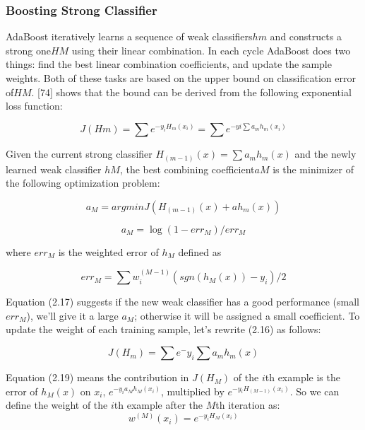 \documentclass[12pt, twoside]{report}
\begin{document}
	\subsubsection{Boosting Strong Classifier}
	
	\par
	AdaBoost iteratively learns a sequence of weak classifiers$ hm$ and constructs a strong one$
	HM$ using their linear combination. In each cycle AdaBoost does two things: find the best
	linear combination coefficients, and update the sample weights. Both of these tasks are
	based on the upper bound on classification error of$ HM$. [74] shows that the bound can be
	derived from the following exponential loss function:
	
	\begin{equation}
	J(Hm)=\sum  e^{-y_iH_m(x_i)} =\sum e^{-yi \sum a_m h_m(x_i)} 
	\end{equation}
	
	Given the current strong classifier $H_(m-1)(x)=\sum a_m h_m (x)$ and the newly learned
	weak classifier $hM$, the best combining coefficient$ aM$ is the minimizer of the following
	optimization problem:
	
	\begin{equation}
	a_M = argminJ(H_(m-1)(x)+ah_m(x))
	\end{equation}
	
	\begin{equation}
	a_M=\log (1-err_M ) /err_M  
	\end{equation}
	
	where $err_M$ is the weighted error of $h_M$ defined as
	
	\begin{equation}
	err_M=\sum w_i^(M-1)(sgn(h_M(x))-y_i)/2
	\end{equation}
	
	Equation (2.17) suggests if the new weak classifier has a good performance (small $err_M$),
	we’ll give it a large $a_M$; otherwise it will be assigned a small coefficient.
	To update the weight of each training sample, let’s rewrite (2.16) as follows:
	
	\begin{equation}
	J(H_m)=\sum e^-y_i \sum a_m h_m (x)
	\end{equation}
	
	\newpage
	\par
	Equation (2.19) means the contribution in $J(H_M)$ of the $i$th example is the error of $h_M(x)$ on $x_i$, $e^{-y_ia_Mh_M(x_i)}$, multiplied by $e^{-y_iH_{(M-1)}(x_i)}$. So we can define the weight of the $i$th example after the $M$th iteration as:
	\begin{equation}
		w^{(M)}(x_i) = e^{-y_iH_M(x_i)}
	\end{equation}
\end{document}
